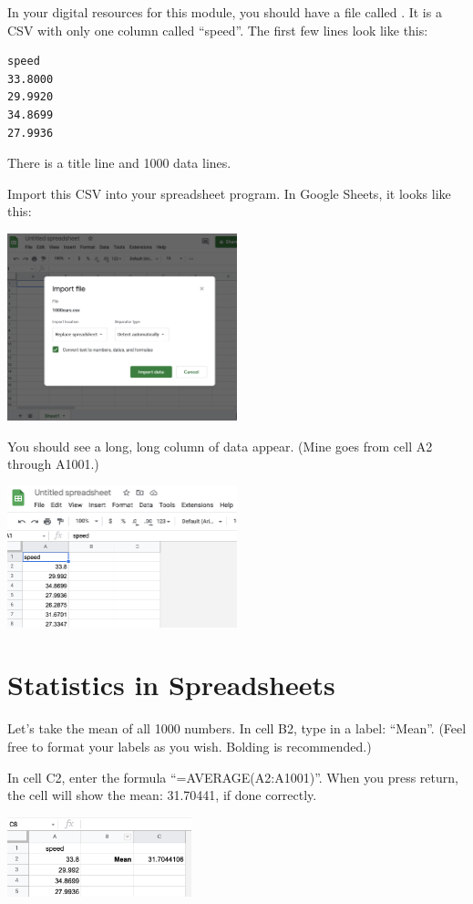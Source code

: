In your digital resources for this module, you should have a file
called . It is a CSV with only one column called
``speed''. The first few lines look like this:

\begin{Verbatim}
speed
33.8000
29.9920
34.8699
27.9936
\end{Verbatim}

There is a title line and 1000 data lines.

Import this CSV into your spreadsheet program. In Google Sheets, it looks like this:

\includegraphics[width=0.5\textwidth]{ImportingCSV.png}

You should see a long, long column of data appear. (Mine goes from cell A2 through A1001.)

\includegraphics[width=0.5\textwidth]{ImportedCSV.png}

\section{Statistics in Spreadsheets}

Let's take the mean of all 1000 numbers.  In cell B2, type in a label:
``Mean''. (Feel free to format your labels as you wish. Bolding is recommended.)

In cell C2, enter the formula ``=AVERAGE(A2:A1001)''. When
you press return, the cell will show the mean: 31.70441, if done correctly.

\includegraphics[width=0.4\textwidth]{Spread_mean.png}

